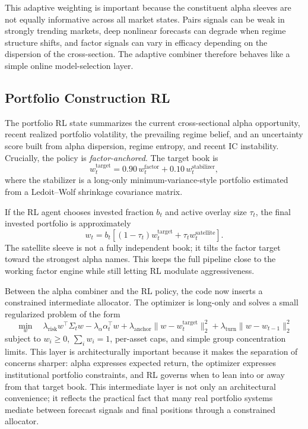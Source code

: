 \documentclass[10pt,twocolumn]{article}
\begin{document}
This adaptive weighting is important because the constituent alpha sleeves are
not equally informative across all market states. Pairs signals can be weak in
strongly trending markets, deep nonlinear forecasts can degrade when regime
structure shifts, and factor signals can vary in efficacy depending on the
dispersion of the cross-section. The adaptive combiner therefore behaves like a
simple online model-selection layer.

\subsection{Portfolio Construction RL}

The portfolio RL state summarizes the current cross-sectional alpha
opportunity, recent realized portfolio volatility, the prevailing regime
belief, and an uncertainty score built from alpha dispersion, regime entropy,
and recent IC instability. Crucially, the policy is \emph{factor-anchored}. The
target book is
\[
w_t^{\text{target}} =
0.90\,w_t^{\text{factor}} +
0.10\,w_t^{\text{stabilizer}},
\]
where the stabilizer is a long-only minimum-variance-style portfolio estimated
from a Ledoit--Wolf shrinkage covariance matrix.

If the RL agent chooses invested fraction $b_t$ and active overlay size $\tau_t$,
the final invested portfolio is approximately
\[
w_t =
b_t \left[(1-\tau_t)w_t^{\text{target}} + \tau_t w_t^{\text{satellite}}\right].
\]
The satellite sleeve is not a fully independent book; it tilts the factor target
toward the strongest alpha names. This keeps the full pipeline close to the
working factor engine while still letting RL modulate aggressiveness.

Between the alpha combiner and the RL policy, the code now inserts a constrained
intermediate allocator. The optimizer is long-only and solves a small
regularized problem of the form
\[
\min_w \quad
\lambda_{\mathrm{risk}} w^\top \Sigma_t w
- \lambda_{\alpha}\alpha_t^\top w
+ \lambda_{\mathrm{anchor}}\lVert w - w_t^{\mathrm{target}} \rVert_2^2
+ \lambda_{\mathrm{turn}}\lVert w - w_{t-1} \rVert_2^2
\]
subject to $w_i \ge 0$, $\sum_i w_i = 1$, per-asset caps, and simple group
concentration limits. This layer is architecturally important because it makes
the separation of concerns sharper: alpha expresses expected return, the
optimizer expresses institutional portfolio constraints, and RL governs when to
lean into or away from that target book.
This intermediate layer is not only an architectural convenience; it reflects
the practical fact that many real portfolio systems mediate between forecast
signals and final positions through a constrained allocator.
\end{document}
